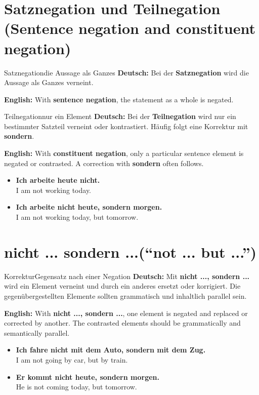 \documentclass[a4paper,11pt]{article}
\newcommand{\GermanText}[1]{\textbf{Deutsch: }#1\par}
\newcommand{\EnglishText}[1]{{\small\color{SoftGray}\textbf{English: }#1\par}}
\newcommand{\ExampleItem}[2]{\item \textbf{#1}\\{\small\color{SoftGray}#2}}
\begin{document}
\section{Satznegation und Teilnegation \textnormal{(Sentence negation and constituent negation)}}
\begin{grammarentry}{Satznegation}{die Aussage als Ganzes}
\GermanText{Bei der \textbf{Satznegation} wird die Aussage als Ganzes verneint.}
\EnglishText{With \textbf{sentence negation}, the statement as a whole is negated.}
\end{grammarentry}
\begin{grammarentry}{Teilnegation}{nur ein Element}
\GermanText{Bei der \textbf{Teilnegation} wird nur ein bestimmter Satzteil verneint oder kontrastiert. Häufig folgt eine Korrektur mit \textbf{sondern}.}
\EnglishText{With \textbf{constituent negation}, only a particular sentence element is negated or contrasted. A correction with \textbf{sondern} often follows.}
\end{grammarentry}
\begin{exbox}\begin{itemize}
\ExampleItem{Ich arbeite heute nicht.}{I am not working today.}
\ExampleItem{Ich arbeite nicht heute, sondern morgen.}{I am not working today, but tomorrow.}
\end{itemize}\end{exbox}

\section{\glqq nicht ... sondern ...\grqq \textnormal{(``not ... but ...'')}}
\begin{grammarentry}{Korrektur}{Gegensatz nach einer Negation}
\GermanText{Mit \textbf{nicht ..., sondern ...} wird ein Element verneint und durch ein anderes ersetzt oder korrigiert. Die gegenübergestellten Elemente sollten grammatisch und inhaltlich parallel sein.}
\EnglishText{With \textbf{nicht ..., sondern ...}, one element is negated and replaced or corrected by another. The contrasted elements should be grammatically and semantically parallel.}
\end{grammarentry}
\begin{exbox}\begin{itemize}
\ExampleItem{Ich fahre nicht mit dem Auto, sondern mit dem Zug.}{I am not going by car, but by train.}
\ExampleItem{Er kommt nicht heute, sondern morgen.}{He is not coming today, but tomorrow.}
\end{itemize}\end{exbox}
\end{document}
